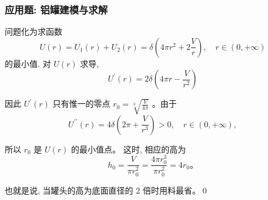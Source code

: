 \documentclass[
10pt,
aspectratio=43,
]{beamer}
\begin{document}
\begin{frame}
	\frametitle{应用题: 铝罐建模与求解}
	问题化为求函数
	$$
		U(r)=U_1(r)+U_2(r)=\delta\left(4 \pi r^2+2 \frac{V}{r}\right), \quad r \in(0,+\infty)
	$$
	的最小值.
	对 $U(r)$ 求导,
	$$
		U^{\prime}(r)=2 \delta\left(4 \pi r-\frac{V}{r^2}\right)
	$$

	因此 $U^{\prime}(r)$ 只有惟一的零点 $r_0=\sqrt[3]{\frac{V}{4 \pi}}$ 。由于
	$$
		U^{\prime \prime}(r)=4 \delta\left(2 \pi+\frac{V}{r^3}\right)>0, \quad r \in(0,+\infty),
	$$

	所以 $r_0$ 是 $U(r)$ 的最小值点。
	这时, 相应的高为
	$$
		h_0=\frac{V}{\pi r_0^2}=\frac{4 \pi r_0^3}{\pi r_0^2}=4 r_0 。
	$$

	也就是说, 当罐头的高为底面直径的 2 倍时用料最省。\qed
\end{frame}
\end{document}
